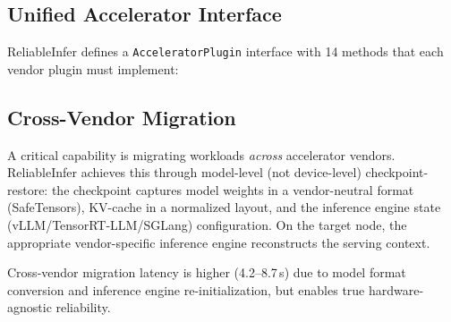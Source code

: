 \documentclass[conference,10pt,letterpaper]{IEEEtran}
\begin{document}
\subsection{Unified Accelerator Interface}

ReliableInfer defines a \texttt{AcceleratorPlugin} interface with 14 methods that each vendor plugin must implement:

\begin{table}[!t]
\caption{Hardware Support Matrix}
\label{tab:hw}
\centering\scriptsize
{}
\end{table}

\subsection{Cross-Vendor Migration}

A critical capability is migrating workloads \emph{across} accelerator vendors. ReliableInfer achieves this through model-level (not device-level) checkpoint-restore: the checkpoint captures model weights in a vendor-neutral format (SafeTensors), KV-cache in a normalized layout, and the inference engine state (vLLM/TensorRT-LLM/SGLang) configuration. On the target node, the appropriate vendor-specific inference engine reconstructs the serving context.

Cross-vendor migration latency is higher (4.2--8.7\,s) due to model format conversion and inference engine re-initialization, but enables true hardware-agnostic reliability.

\end{document}

